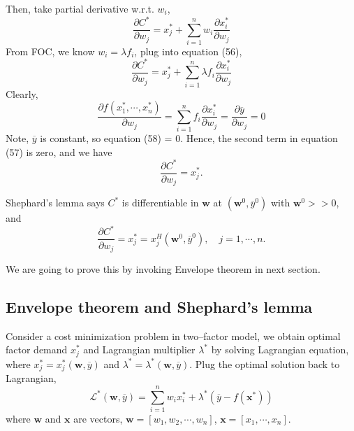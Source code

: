\documentclass[12pt]{article}
\begin{document}
Then, take partial derivative w.r.t. $ w_{i} $, 
\begin{equation}
				\frac{\partial C^{*} }{\partial w_{j} } = 
				x_{j}^{*} + \sum\limits_{i = 1} ^n w_{i}\frac{\partial x_{i}^{*} }
				{\partial w_{j} }	
\end{equation}
From FOC, we know $ w_{i} = \lambda f_{i} $, plug into equation (56),
\begin{equation}
				\frac{\partial C^{*} }{\partial w_{j} } = 
				x_{j}^{*} + \sum\limits_{i = 1} ^n \lambda f_{i}\frac{\partial x_{i}^{*}
				}{\partial w_{j} }	
\end{equation}
Clearly, 
\begin{equation}
				\frac{\partial f(x_1^{*},\cdots, x_{n}^{*}) }{\partial w_{j} }
				=\sum\limits_{i = 1} ^n f_{i}\frac{\partial x_{i}^{*} }{\partial w_{j} }
				=\frac{\partial \overline{y} }{\partial w_{j} } = 0
\end{equation}
Note, $ \overline{y} $ is constant, so equation (58) = 0.
Hence, the second term in equation (57) is zero, and we have
\begin{equation}
				\frac{\partial C^{*} }{\partial w_{j} } = x_{j}^{*}.
\end{equation}

Shephard's lemma says $ C^{*} $ is differentiable in $ \bm{w} $ at 
$ (\bm{w}^{0}, \overline{y}^{0}) $ with $ \bm{w}^{0} > > 0 $, and
\begin{equation}
				\frac{\partial C^{*} }{\partial w_{j} } = x_{j}^{*} = x_{j}^{H}(
				\bm{w}^{0},\overline{y}^{0}), \quad j = 1, \cdots, n.
\end{equation}


We are going to prove this by invoking Envelope theorem in next section.






\subsection{Envelope theorem and Shephard's lemma}


Consider a cost minimization problem in two--factor model, we obtain optimal
factor demand $ x_{j}^{*} $ and Lagrangian multiplier $ \lambda^{*} $
by solving Lagrangian equation, where $ x_{j}^{*} = x_{j}^{*}(\bm{w},\overline{y}
)  $ and $ \lambda ^{*} = \lambda ^{*}(\bm{w},\overline{y}) $. Plug the optimal
solution back to Lagrangian, 
\begin{equation}
				\mathscr{L}^{*}(\bm{w},\overline{y}) = \sum\limits_{i = 1} ^n w_{i}x_{i}
				^{*} + \lambda ^{*}(\overline{y} - f(\bm{x}^{*}))
\end{equation}
where $ \bm{w} $ and $ \bm{x} $ are vectors, $ \bm{w} = [w_1,w_2,\cdots,w_{n}] $,
$ \bm{x} = [x_1, \cdots, x_{n}] $.
\end{document}
